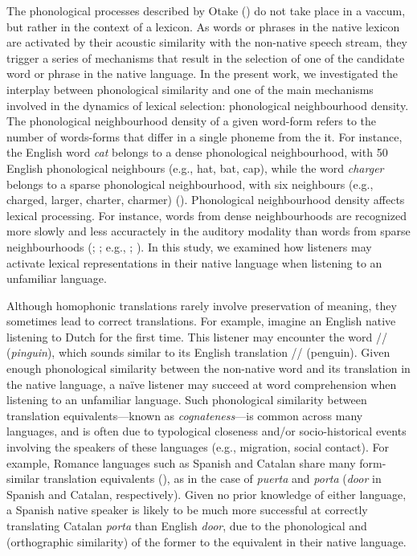 \documentclass[
  man,
  longtable,
  nolmodern,
  notxfonts,
  notimes,
  colorlinks=true,linkcolor=blue,citecolor=blue,urlcolor=blue]{apa7}
\begin{document}
The phonological processes described by Otake
() do not take place in a
vaccum, but rather in the context of a lexicon. As words or phrases in
the native lexicon are activated by their acoustic similarity with the
non-native speech stream, they trigger a series of mechanisms that
result in the selection of one of the candidate word or phrase in the
native language. In the present work, we investigated the interplay
between phonological similarity and one of the main mechanisms involved
in the dynamics of lexical selection: phonological neighbourhood
density. The phonological neighbourhood density of a given word-form
refers to the number of words-forms that differ in a single phoneme from
the it. For instance, the English word \emph{cat} belongs to a dense
phonological neighbourhood, with 50 English phonological neighbours
(e.g., hat, bat, cap), while the word \emph{charger} belongs to a sparse
phonological neighbourhood, with six neighbours (e.g., charged, larger,
charter, charmer) (). Phonological neighbourhood density affects lexical processing.
For instance, words from dense neighbourhoods are recognized more slowly
and less accuractely in the auditory modality than words from sparse
neighbourhoods (; ; e.g.,
;
). In this
study, we examined how listeners may activate lexical representations in
their native language when listening to an unfamiliar language.

Although homophonic translations rarely involve preservation of meaning,
they sometimes lead to correct translations. For example, imagine an
English native listening to Dutch for the first time. This listener may
encounter the word // (\emph{pinguin}), which sounds
similar to its English translation // (penguin). Given
enough phonological similarity between the non-native word and its
translation in the native language, a naïve listener may succeed at word
comprehension when listening to an unfamiliar language. Such
phonological similarity between translation equivalents---known as
\emph{cognateness}---is common across many languages, and is often due
to typological closeness and/or socio-historical events involving the
speakers of these languages (e.g., migration, social contact). For
example, Romance languages such as Spanish and Catalan share many
form-similar translation equivalents
(), as in
the case of \emph{puerta} and \emph{porta} (\emph{door} in Spanish and
Catalan, respectively). Given no prior knowledge of either language, a
Spanish native speaker is likely to be much more successful at correctly
translating Catalan \emph{porta} than English \emph{door}, due to the
phonological and (orthographic similarity) of the former to the
equivalent in their native language.
\end{document}
